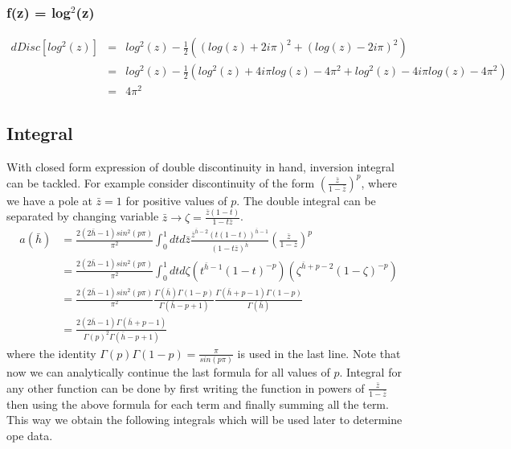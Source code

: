 \documentclass[12pt,a4paper,oneside]{book}
\theoremstyle{definition}
\begin{document}
        \subsubsection*{f(z) = log$^2$(z)}
            \begin{eqnarray}
                dDisc[log^2(z)] &=& log^2(z) - \frac{1}{2}((log(z)+2i\pi)^2+(log(z)-2i\pi)^2)\nonumber\\
                &=& log^2(z)-\frac{1}{2}(log^2(z)+4i\pi log(z)-4\pi^2+log^2(z)-4i\pi log(z)-4\pi^2)\nonumber\\
                &=& 4\pi^2
            \end{eqnarray}
    \subsection{Integral}\label{inversion_integral}
        With closed form expression of double discontinuity in hand, inversion integral can be tackled. For example consider discontinuity of the form $\left(\frac{\bar{z}}{1-\bar{z}}\right)^p$, where we have a pole at $\bar{z} = 1$ for positive values of $p$. The double integral can be separated by changing variable $\bar{z}\to \zeta = \frac{\bar{z}(1-t)}{1-t\bar{z}}$.
        \begin{align}
            \hat{a}(\bar{h}) &= \frac{2(2\bar{h}-1)sin^2(p\pi)}{\pi^2}\int_{0}^{1}dt d\bar{z}\frac{\bar{z}^{\bar{h}-2}(t(1-t))^{\bar{h}-1}}{(1-t\bar{z})^{\bar{h}}} \left(\frac{\bar{z}}{1-\bar{z}}\right)^{p} \nonumber\\
            &= \frac{2(2\bar{h}-1)sin^2(p\pi)}{\pi^2}\int_{0}^{1}dtd\zeta (t^{\bar{h}-1}(1-t)^{-p})(\zeta^{\bar{h}+p-2}(1-\zeta)^{-p})\\
            &= \frac{2(2\bar{h}-1)sin^2(p\pi)}{\pi^2} \frac{\Gamma(\bar{h})\Gamma(1-p)}{\Gamma(\bar{h}-p+1)}\frac{\Gamma(\bar{h}+p-1)\Gamma(1-p)}{\Gamma(\bar{h})}\nonumber\\
            &= \frac{2(2\bar{h}-1)\Gamma(\bar{h}+p-1)}{\Gamma(p)^2\Gamma(\bar{h}-p+1)}\nonumber
        \end{align}
        where the identity $\Gamma(p)\Gamma(1-p) = \frac{\pi}{sin(p\pi)}$ is used in the last line. Note that now we can analytically continue the last formula for all values of $p$. Integral for any other function can be done by first writing the function in powers of $\frac{\bar{z}}{1-\bar{z}}$ then using the above formula for each term and finally summing all the term. This way we obtain the following integrals which will be used later to determine ope data.
\end{document}
